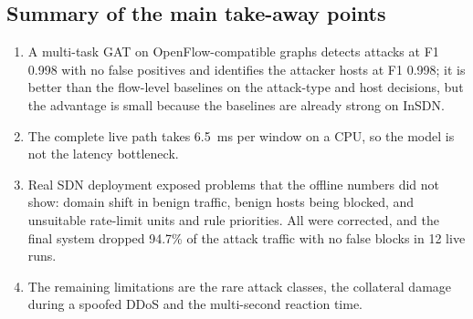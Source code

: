 \subsection{Summary of the main take-away points}
\begin{enumerate}
	\item A multi-task GAT on OpenFlow-compatible graphs detects attacks at F1 0.998 with no false positives and identifies the attacker hosts at F1 0.998; it is better than the flow-level baselines on the attack-type and host decisions, but the advantage is small because the baselines are already strong on InSDN.
	\item The complete live path takes 6.5~ms per window on a CPU, so the model is not the latency bottleneck.
	\item Real SDN deployment exposed problems that the offline numbers did not show: domain shift in benign traffic, benign hosts being blocked, and unsuitable rate-limit units and rule priorities. All were corrected, and the final system dropped 94.7\% of the attack traffic with no false blocks in 12 live runs.
	\item The remaining limitations are the rare attack classes, the collateral damage during a spoofed DDoS and the multi-second reaction time.
\end{enumerate}
